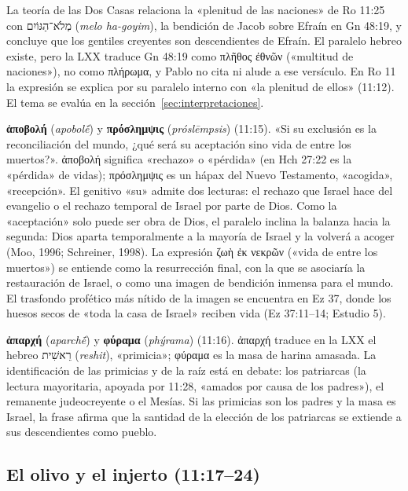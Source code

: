 \documentclass[11pt,letterpaper]{article}
\newcommand{\heb}[1]{\mbox{\foreignlanguage{hebrew}{#1}}}
\newcommand{\grc}[1]{\foreignlanguage{ancientgreek}{#1}}
\begin{document}
\begin{nota}
La teoría de las Dos Casas relaciona la «plenitud de las naciones» de Ro 11:25 con \heb{מְלֹא־הַגּוֹיִם} (\emph{melo ha-goyim}), la bendición de Jacob sobre Efraín en Gn 48:19, y concluye que los gentiles creyentes son descendientes de Efraín. El paralelo hebreo existe, pero la LXX traduce Gn 48:19 como \grc{πλῆθος ἐθνῶν} («multitud de naciones»), no como \grc{πλήρωμα}, y Pablo no cita ni alude a ese versículo. En Ro 11 la expresión se explica por su paralelo interno con «la plenitud de ellos» (11:12). El tema se evalúa en la sección~\ref{sec:interpretaciones}.
\end{nota}

\textbf{\grc{ἀποβολή}} (\emph{apobolḗ}) y \textbf{\grc{πρόσλημψις}} (\emph{próslēmpsis}) (11:15). «Si su exclusión es la reconciliación del mundo, ¿qué será su aceptación sino vida de entre los muertos?». \grc{ἀποβολή} significa «rechazo» o «pérdida» (en Hch 27:22 es la «pérdida» de vidas); \grc{πρόσλημψις} es un hápax del Nuevo Testamento, «acogida», «recepción». El genitivo «su» admite dos lecturas: el rechazo que Israel hace del evangelio o el rechazo temporal de Israel por parte de Dios. Como la «aceptación» solo puede ser obra de Dios, el paralelo inclina la balanza hacia la segunda: Dios aparta temporalmente a la mayoría de Israel y la volverá a acoger (Moo, 1996; Schreiner, 1998). La expresión \grc{ζωὴ ἐκ νεκρῶν} («vida de entre los muertos») se entiende como la resurrección final, con la que se asociaría la restauración de Israel, o como una imagen de bendición inmensa para el mundo. El trasfondo profético más nítido de la imagen se encuentra en Ez 37, donde los huesos secos de «toda la casa de Israel» reciben vida (Ez 37:11--14; Estudio 5).

\textbf{\grc{ἀπαρχή}} (\emph{aparchḗ}) y \textbf{\grc{φύραμα}} (\emph{phýrama}) (11:16). \grc{ἀπαρχή} traduce en la LXX el hebreo \heb{רֵאשִׁית} (\emph{reshit}), «primicia»; \grc{φύραμα} es la masa de harina amasada. La identificación de las primicias y de la raíz está en debate: los patriarcas (la lectura mayoritaria, apoyada por 11:28, «amados por causa de los padres»), el remanente judeocreyente o el Mesías. Si las primicias son los padres y la masa es Israel, la frase afirma que la santidad de la elección de los patriarcas se extiende a sus descendientes como pueblo.

\subsection{El olivo y el injerto (11:17--24)}
\end{document}
